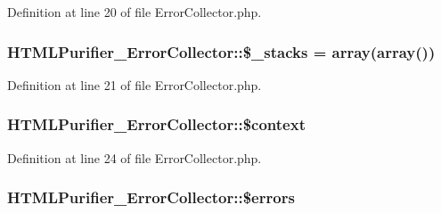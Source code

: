 Definition at line 20 of file Error\+Collector.\+php.

\hypertarget{classHTMLPurifier__ErrorCollector_a3462be7c083f9ff667813674690e4c10}{
\subsubsection[{\$\+\_\+stacks}]{\setlength{\rightskip}{0pt plus 5cm}H\+T\+M\+L\+Purifier\+\_\+\+Error\+Collector\+::\$\+\_\+stacks = array(array())\hspace{0.3cm}{\ttfamily [protected]}}}\label{classHTMLPurifier__ErrorCollector_a3462be7c083f9ff667813674690e4c10}


Definition at line 21 of file Error\+Collector.\+php.

\hypertarget{classHTMLPurifier__ErrorCollector_abb5f03a7e8958c24cc06156f30dc887a}{
\subsubsection[{\$context}]{\setlength{\rightskip}{0pt plus 5cm}H\+T\+M\+L\+Purifier\+\_\+\+Error\+Collector\+::\$context\hspace{0.3cm}{\ttfamily [protected]}}}\label{classHTMLPurifier__ErrorCollector_abb5f03a7e8958c24cc06156f30dc887a}


Definition at line 24 of file Error\+Collector.\+php.

\hypertarget{classHTMLPurifier__ErrorCollector_a8f96f3a9588f584a2f0ec3997bdbc832}{
\subsubsection[{\$errors}]{\setlength{\rightskip}{0pt plus 5cm}H\+T\+M\+L\+Purifier\+\_\+\+Error\+Collector\+::\$errors\hspace{0.3cm}{\ttfamily [protected]}}}\label{classHTMLPurifier__ErrorCollector_a8f96f3a9588f584a2f0ec3997bdbc832}


